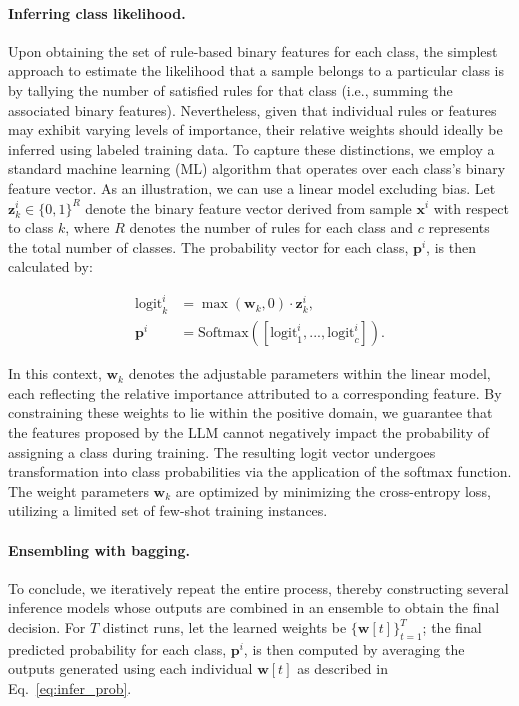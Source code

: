\vspace*{-0.12in}
\paragraph{Inferring class likelihood.} Upon obtaining the set of rule-based binary features for each class, the simplest approach to estimate the likelihood that a sample belongs to a particular class is by tallying the number of satisfied rules for that class (i.e., summing the associated binary features). Nevertheless, given that individual rules or features may exhibit varying levels of importance, their relative weights should ideally be inferred using labeled training data. To capture these distinctions, we employ a standard machine learning (ML) algorithm that operates over each class’s binary feature vector. As an illustration, we can use a linear model excluding bias. Let $\mathbf{z}_k^i \in \{0, 1\}^R$ denote the binary feature vector derived from sample $\mathbf{x}^i$ with respect to class $k$, where $R$ denotes the number of rules for each class and $c$ represents the total number of classes. The probability vector for each class, $\mathbf{p}^i$, is then calculated by:

\begin{align}
\text{logit}_k^i &= \max(\mathbf{w}_k, 0) \cdot \mathbf{z}_k^i, \nonumber \\
\mathbf{p}^i &= \text{Softmax}({[\text{logit}_{1}^i, ..., \text{logit}_{c}^i]}). \label{eq:infer_prob}
\end{align}

In this context, $\mathbf{w}_k$ denotes the adjustable parameters within the linear model, each reflecting the relative importance attributed to a corresponding feature. By constraining these weights to lie within the positive domain, we guarantee that the features proposed by the LLM cannot negatively impact the probability of assigning a class during training. The resulting logit vector undergoes transformation into class probabilities via the application of the softmax function. The weight parameters $\mathbf{w}_k$ are optimized by minimizing the cross-entropy loss, utilizing a limited set of few-shot training instances.

\vspace*{-0.12in}
\paragraph{Ensembling with bagging.} To conclude, we iteratively repeat the entire process, thereby constructing several inference models whose outputs are combined in an ensemble to obtain the final decision. For $T$ distinct runs, let the learned weights be $\{\mathbf{w}[t]\}_{t=1}^T$; the final predicted probability for each class, $\mathbf{p}^i$, is then computed by averaging the outputs generated using each individual $\mathbf{w}[t]$ as described in Eq.~\ref{eq:infer_prob}.

